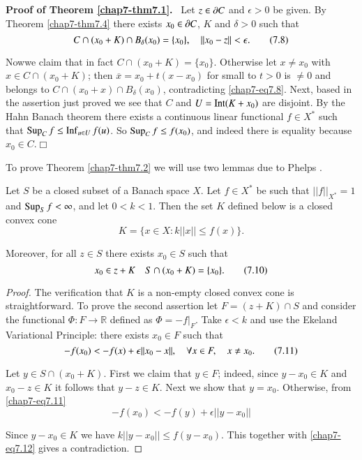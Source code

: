 \noindent
{\bf Proof of Theorem \ref{chap7-thm7.1}.}~ Let $z\in \partial C$ and
$\epsilon>0$ be given. By Theorem \ref{chap7-thm7.4} there exists
$x_{0}\in \partial C$, $K$ and $\delta>0$ such that
\begin{equation*}
C\cap (x_{0}+K)\cap B_{\delta}(x_{0})=\{x_{0}\},\quad
||x_{0}-z||<\epsilon.\tag{7.8}\label{chap7-eq7.8} 
\end{equation*}

Now\pageoriginale we claim that in fact $C\cap
(x_{0}+K)=\{x_{0}\}$. Otherwise let $x\neq x_{0}$ with $x\in C\cap
(x_{0}+K)$; then $\overline{x}=x_{0}+t(x-x_{0})$ for small to $t>0$ is
$\neq 0$ and belongs to $C\cap (x_{0}+x)\cap B_{\delta}(x_{0})$,
contradicting \eqref{chap7-eq7.8}. Next, based in the assertion just
proved we see that $C$ and $U=\operatorname{Int}(K+x_{0})$ are disjoint. By the Hahn
Banach theorem there exists a continuous linear functional $f\in
X^{*}$ such that $\operatorname{Sup}_{C}f\leq \operatorname{Inf}_{u\in U}f(u)$. So $\operatorname{Sup}_{C}f\leq
f(x_{0})$, and indeed there is equality because $x_{0}\in
C$.\hfill$\Box$

To prove Theorem \ref{chap7-thm7.2} we will use two lemmas due to
Phelps \cite{key62}.

\begin{lemma}\label{chap7-lem7.6}
Let $S$ be a closed subset of a Banach space $X$. Let $f\in X^{*}$ be
such that $||f||_{X^{*}}=1$ and $\operatorname{Sup}_{S}f<\infty$, and let
$0<k<1$. Then the set $K$ defined below is a closed convex cone
\begin{equation*}
K=\{x\in X:k||x||\leq f(x)\}.\tag{7.9}\label{chap7-eq7.9}
\end{equation*}

Moreover, for all $z\in S$ there exists $x_{0}\in S$ such that
\begin{equation*}
x_{0}\in z+K\quad S\cap (x_{0}+K)=\{x_{0}\}.\tag{7.10}\label{chap7-eq7.10}
\end{equation*}
\end{lemma}

\begin{proof}
The verification that $K$ is a non-empty closed convex cone is
straightforward. To prove the second assertion let $F=(z+K)\cap S$ and
consider the functional $\Phi:F\to \mathbb{R}$ defined as
$\Phi=-f|_{F}$. Take $\epsilon<k$ and use the Ekeland Variational
Principle: there exists $x_{0}\in F$ such that
\begin{equation*}
-f(x_{0})<-f(x)+\epsilon||x_{0}-x||,\quad \forall x\in F,\quad x\neq
x_{0}.\tag{7.11}\label{chap7-eq7.11}
\end{equation*}

Let $y\in S\cap (x_{0}+K)$. First we claim that $y\in F$; indeed,
since $y-x_{0}\in K$ and $x_{0}-z\in K$ it follows that $y-z\in
K$. Next we show that $y=x_{0}$. Otherwise, from \eqref{chap7-eq7.11}
\begin{equation*}
-f(x_{0})<-f(y)+\epsilon||y-x_{0}||\tag{7.12}\label{chap7-eq7.12}
\end{equation*}

Since $y-x_{0}\in K$ we have $k||y-x_{0}||\leq f(y-x_{0})$. This
together with \eqref{chap7-eq7.12} gives a contradiction.
\end{proof}


